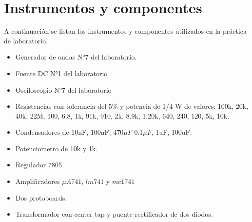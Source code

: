 \section{Instrumentos y componentes}

A continuación se listan los instrumentos y componentes utilizados en la práctica de laboratorio.

\begin{itemize}
    \item Generador de ondas N°7 del laboratorio. 
    \item Fuente DC N°1 del laboratorio
    \item Osciloscopio N°7 del laboratorio
    \item Resistencias con tolerancia del 5\% y potencia de 1/4 W de valores: 100k, 20k, 40k, 22M, 100, 6.8, 1k, 91k, 910, 2k, 8.9k, 1.20k, 640, 240, 120, 5k, 10k.
    \item Condensadores de 10nF, 100nF, $470\mu F$ $0.1 \mu F$, 1uF, 100uF.
    \item Potenciometro de 10k y 1k.
    \item Regulador 7805
    \item Amplificadores $\mu A741$, $lm741$ y $mc1741$
    \item Dos protoboards.
    \item Transformador con center tap y puente rectificador de dos diodos.
\end{itemize}